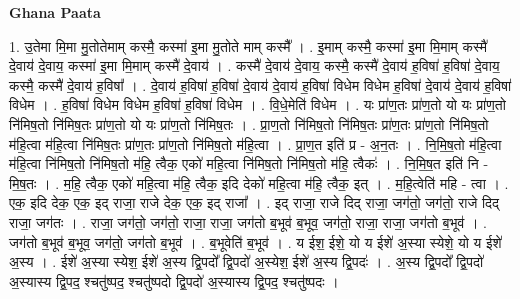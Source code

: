 \documentclass[17pt]{extarticle}
\begin{document}
\textbf{Ghana Paata } \newline

1. उ॒तेमा मि॒मा मु॒तोतेमाम् कस्मै॒ कस्मा॑ इ॒मा मु॒तोते माम् कस्मै᳚ । . इ॒माम् कस्मै॒ कस्मा॑ इ॒मा मि॒माम् कस्मै॑ दे॒वाय॑ दे॒वाय॒ कस्मा॑ इ॒मा मि॒माम् कस्मै॑ दे॒वाय॑ । . कस्मै॑ दे॒वाय॑ दे॒वाय॒ कस्मै॒ कस्मै॑ दे॒वाय॑ ह॒विषा॑ ह॒विषा॑ दे॒वाय॒ कस्मै॒ कस्मै॑ दे॒वाय॑ ह॒विषा᳚ । . दे॒वाय॑ ह॒विषा॑ ह॒विषा॑ दे॒वाय॑ दे॒वाय॑ ह॒विषा॑ विधेम विधेम ह॒विषा॑ दे॒वाय॑ दे॒वाय॑ ह॒विषा॑ विधेम । . ह॒विषा॑ विधेम विधेम ह॒विषा॑ ह॒विषा॑ विधेम । . वि॒धे॒मेति॑ विधेम । . यः प्रा॑ण॒तः प्रा॑ण॒तो यो यः प्रा॑ण॒तो नि॑मिष॒तो नि॑मिष॒तः प्रा॑ण॒तो यो यः प्रा॑ण॒तो नि॑मिष॒तः । . प्रा॒ण॒तो नि॑मिष॒तो नि॑मिष॒तः प्रा॑ण॒तः प्रा॑ण॒तो नि॑मिष॒तो म॑हि॒त्वा म॑हि॒त्वा नि॑मिष॒तः प्रा॑ण॒तः प्रा॑ण॒तो नि॑मिष॒तो म॑हि॒त्वा । . प्रा॒ण॒त इति॑ प्र - अ॒न॒तः । . नि॒मि॒ष॒तो म॑हि॒त्वा म॑हि॒त्वा नि॑मिष॒तो नि॑मिष॒तो म॑हि॒ त्वैक॒ एको॑ महि॒त्वा नि॑मिष॒तो नि॑मिष॒तो म॑हि॒ त्वैकः॑ । . नि॒मि॒ष॒त इति॑ नि - मि॒ष॒तः । . म॒हि॒ त्वैक॒ एको॑ महि॒त्वा म॑हि॒ त्वैक॒ इदि देको॑ महि॒त्वा म॑हि॒ त्वैक॒ इत् । . म॒हि॒त्वेति॑ महि - त्वा । . एक॒ इदि देक॒ एक॒ इद् राजा॒ राजे देक॒ एक॒ इद् राजा᳚ । . इद् राजा॒ राजे दिद् राजा॒ जग॑तो॒ जग॑तो॒ राजे दिद् राजा॒ जग॑तः । . राजा॒ जग॑तो॒ जग॑तो॒ राजा॒ राजा॒ जग॑तो ब॒भूव॑ ब॒भूव॒ जग॑तो॒ राजा॒ राजा॒ जग॑तो ब॒भूव॑ । . जग॑तो ब॒भूव॑ ब॒भूव॒ जग॑तो॒ जग॑तो ब॒भूव॑ । . ब॒भूवेति॑ ब॒भूव॑ । . य ईश॒ ईशे॒ यो य ईशे॑ अ॒स्या स्येशे॒ यो य ईशे॑ अ॒स्य । . ईशे॑ अ॒स्या स्येश॒ ईशे॑ अ॒स्य द्वि॒पदो᳚ द्वि॒पदो॑ अ॒स्येश॒ ईशे॑ अ॒स्य द्वि॒पदः॑ । . अ॒स्य द्वि॒पदो᳚ द्वि॒पदो॑ अ॒स्यास्य द्वि॒पद॒ श्चतु॑ष्पद॒ श्चतु॑ष्पदो द्वि॒पदो॑ अ॒स्यास्य द्वि॒पद॒ श्चतु॑ष्पदः । \newline
\end{document}
